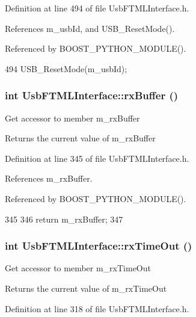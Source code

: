 Definition at line 494 of file UsbFTMLInterface.h.

References m\_\-usbId, and USB\_\-ResetMode().

Referenced by BOOST\_\-PYTHON\_\-MODULE().


\begin{DoxyCode}
494 {USB_ResetMode(m_usbId);}
\end{DoxyCode}
\hypertarget{classUsbFTMLInterface_a41db8f21098bca8fb7a85ce1058ab10b}{
\subsubsection[{rxBuffer}]{\setlength{\rightskip}{0pt plus 5cm}int UsbFTMLInterface::rxBuffer ()}}
\label{classUsbFTMLInterface_a41db8f21098bca8fb7a85ce1058ab10b}
Get accessor to member m\_\-rxBuffer \begin{DoxyReturn}{Returns}
the current value of m\_\-rxBuffer 
\end{DoxyReturn}


Definition at line 345 of file UsbFTMLInterface.h.

References m\_\-rxBuffer.

Referenced by BOOST\_\-PYTHON\_\-MODULE().


\begin{DoxyCode}
345                   {
346     return m_rxBuffer;
347   }
\end{DoxyCode}
\hypertarget{classUsbFTMLInterface_a106df14066462a38f7e4849c9d15828a}{
\subsubsection[{rxTimeOut}]{\setlength{\rightskip}{0pt plus 5cm}int UsbFTMLInterface::rxTimeOut ()}}
\label{classUsbFTMLInterface_a106df14066462a38f7e4849c9d15828a}
Get accessor to member m\_\-rxTimeOut \begin{DoxyReturn}{Returns}
the current value of m\_\-rxTimeOut 
\end{DoxyReturn}


Definition at line 318 of file UsbFTMLInterface.h.

